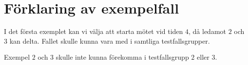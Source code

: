 \section*{Förklaring av exempelfall}
I det första exemplet kan vi välja att starta mötet vid tiden $4$, då ledamot $2$ och $3$ kan delta.
Fallet skulle kunna vara med i samtliga testfallsgrupper.

Exempel $2$ och $3$ skulle inte kunna förekomma i testfallsgrupp $2$ eller $3$.
